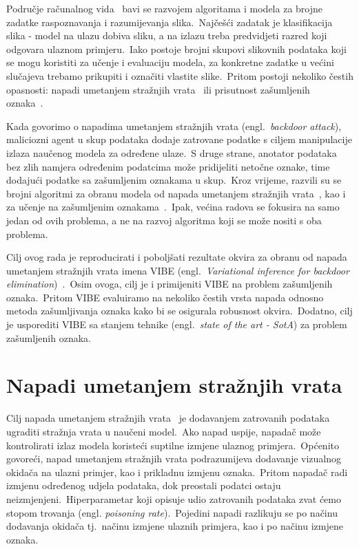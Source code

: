 \documentclass[diplomskirad]{fer}
\begin{document}
Područje računalnog vida~\cite{voulodimos2018deep} bavi se razvojem algoritama i modela za brojne zadatke raspoznavanja i razumijevanja slika.\ Najčešći zadatak je klasifikacija slika - model na ulazu dobiva sliku, a na izlazu treba predvidjeti razred koji odgovara ulaznom primjeru.\ 
Iako postoje brojni skupovi slikovnih podataka koji se mogu koristiti za učenje i evaluaciju modela, za konkretne zadatke u većini slučajeva trebamo prikupiti i označiti vlastite slike.\ 
Pritom postoji nekoliko čestih opasnosti: napadi umetanjem stražnjih vrata~\cite{gao2020backdoor} ili prisutnost zašumljenih oznaka~\cite{gupta2019dealing}.\ 

\pagebreak

Kada govorimo o napadima umetanjem stražnjih vrata (engl.\ \textit{backdoor attack}), maliciozni agent u skup podataka dodaje zatrovane podatke s ciljem manipulacije izlaza naučenog modela za određene ulaze.\ 
S druge strane, anotator podataka bez zlih namjera određenim podatcima može pridijeliti netočne oznake, time dodajući podatke sa zašumljenim oznakama u skup.\ 
Kroz vrijeme, razvili su se brojni algoritmi za obranu modela od napada umetanjem stražnjih vrata~\cite{li2021anti, huang2022backdoor, gao2023backdoor}, kao i za učenje na zašumljenim oznakama~\cite{liu2022robust, chen2024imprecise}.\ Ipak, većina radova se fokusira na samo jedan od ovih problema, a ne na razvoj algoritma koji se može nositi s oba problema.\ 
  
Cilj ovog rada je reproducirati i poboljšati rezultate okvira za obranu od napada umetanjem stražnjih vrata imena VIBE (engl.\ \textit{Variational inference for backdoor elimination})~\cite{sabolic2025seal}.\ 
Osim ovoga, cilj je i primijeniti VIBE na problem zašumljenih oznaka.\ Pritom VIBE evaluiramo na nekoliko čestih vrsta napada odnosno metoda zašumljivanja oznaka kako bi se osigurala robusnost okvira.\ 
Dodatno, cilj je usporediti VIBE sa stanjem tehnike (engl.\ \textit{state of the art - SotA}) za problem zašumljenih oznaka.\
\chapter{Napadi umetanjem stražnjih vrata}
\label{pog:napadi}

Cilj napada umetanjem stražnjih vrata~\cite{gao2020backdoor} je dodavanjem zatrovanih podataka ugraditi stražnja vrata u naučeni model.\ Ako napad uspije, napadač može kontrolirati izlaz modela koristeći suptilne izmjene ulaznog primjera.\ 
Općenito govoreći, napad umetanjem stražnjih vrata podrazumijeva dodavanje vizualnog okidača na ulazni primjer, kao i prikladnu izmjenu oznaka.\ Pritom napadač radi izmjenu određenog udjela podataka, dok preostali podatci ostaju neizmjenjeni.\ 
Hiperparametar koji opisuje udio zatrovanih podataka zvat ćemo stopom trovanja (engl. \textit{poisoning rate}).\ Pojedini napadi razlikuju se po načinu dodavanja okidača tj.\ načinu izmjene ulaznih primjera, kao i po načinu izmjene oznaka.\ 
  
\end{document}
